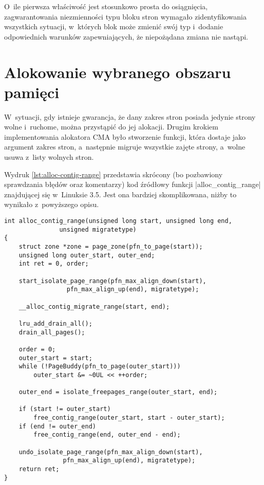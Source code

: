O~ile pierwsza właściwość jest stosunkowo prosta do osiągnięcia,
zagwarantowania niezmienności typu bloku stron wymagało
zidentyfikowania wszystkich sytuacji, w~których blok może zmienić swój
typ i~dodanie odpowiednich warunków zapewniających, że niepożądana
zmiana nie nastąpi.

\section{Alokowanie wybranego obszaru pamięci}\label{sec:alloc-contig-range}

W~sytuacji, gdy istnieje gwarancja, że dany zakres stron posiada
jedynie strony wolne i~ruchome, można przystąpić do jej alokacji.
Drugim krokiem implementowania alokatora CMA było stworzenie funkcji,
która dostaje jako argument zakres stron, a~następnie migruje
wszystkie zajęte strony, a~wolne usuwa z~listy wolnych stron.

Wydruk \ref{lst:alloc-contig-range} przedstawia skrócony (bo
pozbawiony sprawdzania błędów oraz komentarzy) kod źródłowy funkcji
\code|alloc_contig_range| znajdującej się w~Linuksie 3.5.  Jest ona
bardziej skomplikowana, niżby to wynikało z~powyższego opisu.

\begin{lstlisting}[float=tb,caption=Skrócony wydruk funkcji
    \code|alloc_conting_range| z Linuksa 3.5.,label=lst:alloc-contig-range]
int alloc_contig_range(unsigned long start, unsigned long end,
		       unsigned migratetype)
{
	struct zone *zone = page_zone(pfn_to_page(start));
	unsigned long outer_start, outer_end;
	int ret = 0, order;

	start_isolate_page_range(pfn_max_align_down(start),
				 pfn_max_align_up(end), migratetype);

	__alloc_contig_migrate_range(start, end);

	lru_add_drain_all();
	drain_all_pages();

	order = 0;
	outer_start = start;
	while (!PageBuddy(pfn_to_page(outer_start)))
		outer_start &= ~0UL << ++order;

	outer_end = isolate_freepages_range(outer_start, end);

	if (start != outer_start)
		free_contig_range(outer_start, start - outer_start);
	if (end != outer_end)
		free_contig_range(end, outer_end - end);

	undo_isolate_page_range(pfn_max_align_down(start),
				pfn_max_align_up(end), migratetype);
	return ret;
}
\end{lstlisting}


